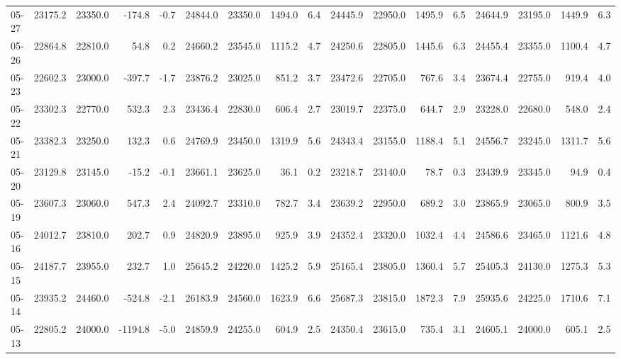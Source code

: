 \begin{threeparttable}
{\begin{tabular}{lrrrrrrrrrrrrrrrr}
  05-27 & 23175.2 & 23350.0 &     -174.8 &           -0.7 & 24844.0 & 23350.0 &     1494.0 &            6.4 & 24445.9 & 22950.0 &     1495.9 &            6.5 & 24644.9 & 23195.0 &      1449.9 &              6.3 \\
  05-26 & 22864.8 & 22810.0 &       54.8 &            0.2 & 24660.2 & 23545.0 &     1115.2 &            4.7 & 24250.6 & 22805.0 &     1445.6 &            6.3 & 24455.4 & 23355.0 &      1100.4 &              4.7 \\
  05-23 & 22602.3 & 23000.0 &     -397.7 &           -1.7 & 23876.2 & 23025.0 &      851.2 &            3.7 & 23472.6 & 22705.0 &      767.6 &            3.4 & 23674.4 & 22755.0 &       919.4 &              4.0 \\
  05-22 & 23302.3 & 22770.0 &      532.3 &            2.3 & 23436.4 & 22830.0 &      606.4 &            2.7 & 23019.7 & 22375.0 &      644.7 &            2.9 & 23228.0 & 22680.0 &       548.0 &              2.4 \\
  05-21 & 23382.3 & 23250.0 &      132.3 &            0.6 & 24769.9 & 23450.0 &     1319.9 &            5.6 & 24343.4 & 23155.0 &     1188.4 &            5.1 & 24556.7 & 23245.0 &      1311.7 &              5.6 \\
  05-20 & 23129.8 & 23145.0 &      -15.2 &           -0.1 & 23661.1 & 23625.0 &       36.1 &            0.2 & 23218.7 & 23140.0 &       78.7 &            0.3 & 23439.9 & 23345.0 &        94.9 &              0.4 \\
  05-19 & 23607.3 & 23060.0 &      547.3 &            2.4 & 24092.7 & 23310.0 &      782.7 &            3.4 & 23639.2 & 22950.0 &      689.2 &            3.0 & 23865.9 & 23065.0 &       800.9 &              3.5 \\
  05-16 & 24012.7 & 23810.0 &      202.7 &            0.9 & 24820.9 & 23895.0 &      925.9 &            3.9 & 24352.4 & 23320.0 &     1032.4 &            4.4 & 24586.6 & 23465.0 &      1121.6 &              4.8 \\
  05-15 & 24187.7 & 23955.0 &      232.7 &            1.0 & 25645.2 & 24220.0 &     1425.2 &            5.9 & 25165.4 & 23805.0 &     1360.4 &            5.7 & 25405.3 & 24130.0 &      1275.3 &              5.3 \\
  05-14 & 23935.2 & 24460.0 &     -524.8 &           -2.1 & 26183.9 & 24560.0 &     1623.9 &            6.6 & 25687.3 & 23815.0 &     1872.3 &            7.9 & 25935.6 & 24225.0 &      1710.6 &              7.1 \\
  05-13 & 22805.2 & 24000.0 &    -1194.8 &           -5.0 & 24859.9 & 24255.0 &      604.9 &            2.5 & 24350.4 & 23615.0 &      735.4 &            3.1 & 24605.1 & 24000.0 &       605.1 &              2.5 \\

\end{tabular}}
\end{threeparttable}
